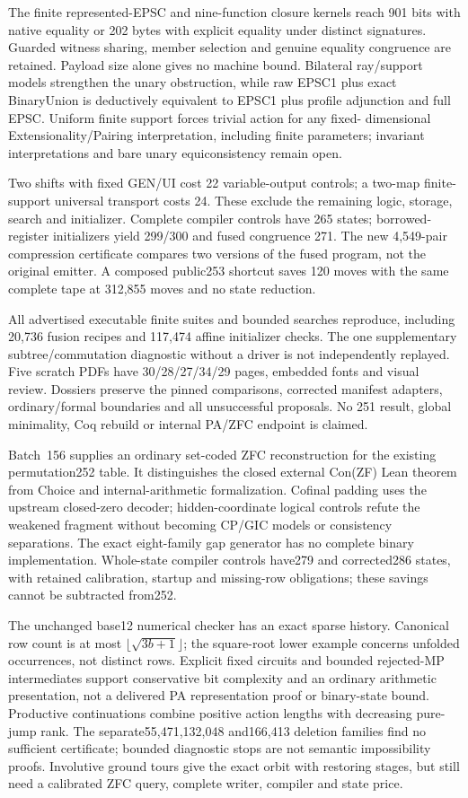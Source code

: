 \documentclass[11pt]{article}
\begin{document}
{The finite represented-EPSC and nine-function closure kernels reach 901 bits
with native equality or 202 bytes with explicit equality under distinct
signatures. Guarded witness sharing, member selection and genuine equality
congruence are retained. Payload size alone gives no machine bound. Bilateral
ray/support models strengthen the unary obstruction, while raw EPSC1 plus
exact BinaryUnion is deductively equivalent to EPSC1 plus profile adjunction
and full EPSC. Uniform finite support forces trivial action for any fixed-
dimensional Extensionality/Pairing interpretation, including finite parameters;
invariant interpretations and bare unary equiconsistency remain open.

Two shifts with fixed GEN/UI cost 22 variable-output controls; a two-map
finite-support universal transport costs 24. These exclude the remaining logic,
storage, search and initializer. Complete compiler controls have 265 states;
borrowed-register initializers yield 299/300 and fused congruence 271. The new
4,549-pair compression certificate compares two versions of the fused program,
not the original emitter. A composed public253 shortcut saves 120 moves with
the same complete tape at 312,855 moves and no state reduction.

All advertised executable finite suites and bounded searches reproduce,
including 20,736 fusion recipes and 117,474 affine initializer checks. The one
supplementary subtree/commutation diagnostic without a driver is not independently
replayed. Five scratch PDFs have 30/28/27/34/29 pages, embedded fonts and visual
review. Dossiers preserve the pinned comparisons, corrected manifest adapters,
ordinary/formal boundaries and all unsuccessful proposals. No 251 result,
global minimality, Coq rebuild or internal PA/ZFC endpoint is claimed.

Batch~156 supplies an ordinary set-coded ZFC reconstruction for the existing
permutation252 table. It distinguishes the closed external Con(ZF) Lean theorem
from Choice and internal-arithmetic formalization. Cofinal padding uses the
upstream closed-zero decoder; hidden-coordinate logical controls refute the
weakened fragment without becoming CP/GIC models or consistency separations.
The exact eight-family gap generator has no complete binary implementation.
Whole-state compiler controls have279 and corrected286 states, with retained
calibration, startup and missing-row obligations; these savings cannot be
subtracted from252.

The unchanged base12 numerical checker has an exact sparse history. Canonical
row count is at most $\lfloor\sqrt{3b+1}\rfloor$; the square-root lower example
concerns unfolded occurrences, not distinct rows. Explicit fixed circuits and
bounded rejected-MP intermediates support conservative bit complexity and an
ordinary arithmetic presentation, not a delivered PA representation proof or
binary-state bound. Productive continuations combine positive action lengths
with decreasing pure-jump rank. The separate55,471,132,048 and166,413 deletion
families find no sufficient certificate; bounded diagnostic stops are not
semantic impossibility proofs. Involutive ground tours give the exact orbit
with restoring stages, but still need a calibrated ZFC query, complete writer,
compiler and state price.

}
\end{document}
